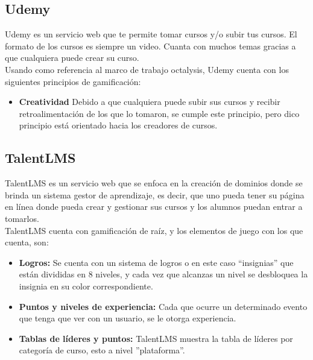 \begin{multicols*}{2}
\begin{itemize}
    \end{itemize}
    
\vfill\null
\columnbreak
\subsection*{Udemy}

 Udemy \cite{PagUdemy} es un servicio web que te permite tomar cursos y/o subir tus cursos.
 El formato de los cursos es siempre un video. Cuanta con muchos temas
 gracias a que cualquiera puede crear su curso.\\

    \noindent Usando como referencia al marco de trabajo octalysis,
    Udemy cuenta con los siguientes principios de gamificación:
    
    \begin{itemize}
        \item {\bf Creatividad} Debido a que cualquiera puede subir
        sus cursos y recibir retroalimentación de los que lo tomaron,
        se cumple este principio, pero dico principio está orientado
        hacia los creadores de cursos.
        
    \end{itemize}
    
    
    
\subsection*{TalentLMS}

 TalentLMS \cite{PagTalentLMS} es un servicio web que se enfoca en la creación de dominios donde se
 brinda un sistema gestor de aprendizaje, es decir, que uno pueda tener su página
 en línea donde pueda crear y gestionar sus cursos y los alumnos puedan entrar a tomarlos.\\
    
    \noindent TalentLMS cuenta con gamificación de raíz,
    y los elementos de juego con los que cuenta, son:
    
    \begin{itemize} 
    
        \item {\bf Logros:} Se cuenta con un sistema de logros o en este caso
        ``insignias'' que están divididas en 8 niveles, y cada vez que alcanzas
        un nivel se desbloquea la insignia en su color correspondiente.
        
        \item {\bf Puntos y niveles de experiencia:} Cada que ocurre un
        determinado evento que tenga que ver con un usuario, se le otorga experiencia.
        
        \item {\bf Tablas de líderes y puntos:} TalentLMS muestra la
        tabla de líderes por categoría de curso, esto a nivel ''plataforma''.
        
    \end{itemize}
    
\end{multicols*}



